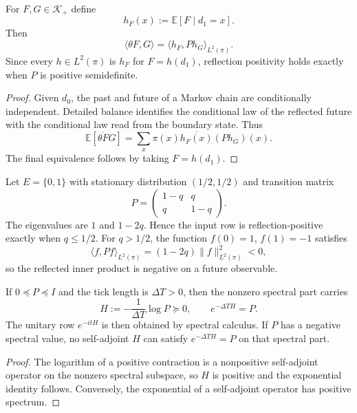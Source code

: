 \begin{theorem}
\label{thm:innovation-input-rp-transition-positivity}
For $F,G\in\mathcal K_+$ define
$$
h_F(x):=\mathbb E[F\mid d_1=x].
$$
Then
$$
\langle\theta F,G\rangle
=
\langle h_F,P h_G\rangle_{L^2(\pi)}.
$$
Since every $h\in L^2(\pi)$ is $h_F$ for $F=h(d_1)$, reflection positivity
holds exactly when $P$ is positive semidefinite.
\end{theorem}

\begin{proof}
Given $d_0$, the past and future of a Markov chain are conditionally
independent. Detailed balance identifies the conditional law of the
reflected future with the conditional law read from the boundary state.
Thus
$$
\mathbb E[\overline{\theta F}G]
=
\sum_x\pi(x)\overline{h_F(x)}(P h_G)(x).
$$
The final equivalence follows by taking $F=h(d_1)$.
\end{proof}

\begin{example}
\label{ex:innovation-input-two-state-reflection-boundary}
Let $E=\{0,1\}$ with stationary distribution $(1/2,1/2)$ and transition
matrix
$$
P=
\begin{pmatrix}
1-q&q\\
q&1-q
\end{pmatrix}.
$$
The eigenvalues are $1$ and $1-2q$. Hence the input row is
reflection-positive exactly when $q\le1/2$. For $q>1/2$, the function
$f(0)=1$, $f(1)=-1$ satisfies
$$
\langle f,Pf\rangle_{L^2(\pi)}=(1-2q)\|f\|^2_{L^2(\pi)}<0,
$$
so the reflected inner product is negative on a future observable.
\end{example}

\begin{corollary}
\label{cor:innovation-input-positive-hamiltonian-row}
If $0\preceq P\preceq I$ and the tick length is $\Delta T>0$, then the
nonzero spectral part carries
$$
H:=-\frac1{\Delta T}\log P\succeq0,
\qquad
e^{-\Delta T H}=P.
$$
The unitary row $e^{-itH}$ is then obtained by spectral calculus. If $P$
has a negative spectral value, no self-adjoint $H$ can satisfy
$e^{-\Delta T H}=P$ on that spectral part.
\end{corollary}

\begin{proof}
The logarithm of a positive contraction is a nonpositive self-adjoint
operator on the nonzero spectral subspace, so $H$ is positive and the
exponential identity follows. Conversely, the exponential of a
self-adjoint operator has positive spectrum.
\end{proof}

